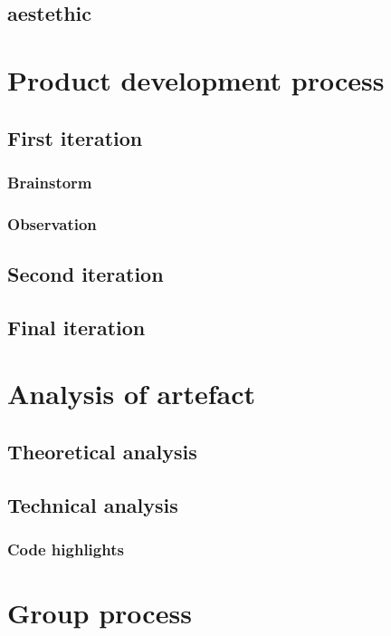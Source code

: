\documentclass[]{article}
\begin{document}
\subsection{aestethic} %



\section{Product development process}

	\subsection{First iteration}
	\subsubsection{Brainstorm}
	\subsubsection{Observation}
	
	\subsection{Second iteration}
	
	\subsection{Final iteration}
	
\section{Analysis of artefact}
\subsection{Theoretical analysis}	
\subsection{Technical analysis}
\subsubsection{Code highlights}



\section{Group process}
\end{document}
